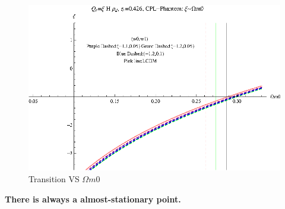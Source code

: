 \documentclass[12pt,a4paper]{article}
\begin{document}
\begin{figure}
\centering
\includegraphics[width=500pt]{rhod_I2CCPL_Phan_xiVSOmegam0.eps}
\caption{Transition VS $\Omega m0$}\label{fig-rhod_I2CCPL_Phan_xiVSOmegam0}
\end{figure}



{\bf There is always a almost-stationary point.}








\end{document}

